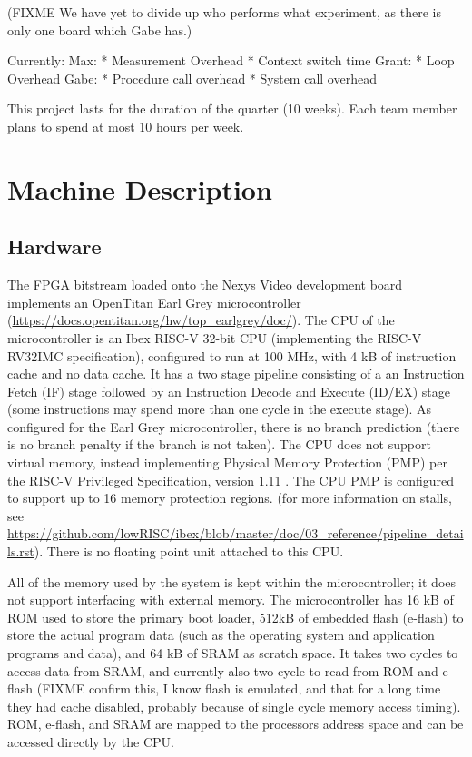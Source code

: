 \documentclass{article}
\begin{document}
(FIXME We have yet to divide up who performs what experiment, as there is only one board which Gabe has.)

Currently:
Max:
* Measurement Overhead
* Context switch time
Grant:
* Loop Overhead
Gabe:
* Procedure call overhead
* System call overhead

This project lasts for the duration of the quarter (10 weeks). Each team member plans to spend at most 10 hours per week.

\section{Machine Description}

\subsection{Hardware}
The FPGA bitstream loaded onto the Nexys Video development board implements an OpenTitan Earl Grey microcontroller (\url{https://docs.opentitan.org/hw/top_earlgrey/doc/}). The CPU of the microcontroller is an Ibex RISC-V 32-bit CPU (implementing the RISC-V RV32IMC specification), configured to run at 100 MHz, with 4 kB of instruction cache and no data cache. It has a two stage pipeline consisting of a an Instruction Fetch (IF) stage followed by an Instruction Decode and Execute (ID/EX) stage (some instructions may spend more than one cycle in the execute stage). As configured for the Earl Grey microcontroller, there is no branch prediction (there is no branch penalty if the branch is not taken). The CPU does not support virtual memory, instead implementing Physical Memory Protection (PMP) per the RISC-V Privileged Specification, version 1.11 \cite{riscv-priv}. The CPU PMP is configured to support up to 16 memory protection regions. (for more information on stalls, see \url{https://github.com/lowRISC/ibex/blob/master/doc/03\_reference/pipeline\_details.rst}). There is no floating point unit attached to this CPU.

All of the memory used by the system is kept within the microcontroller; it does not support interfacing with external memory. The microcontroller has 16 kB of ROM used to store the primary boot loader, 512kB of embedded flash (e-flash) to store the actual program data (such as the operating system and application programs and data), and 64 kB of SRAM as scratch space. It takes two cycles to access data from SRAM, and currently also two cycle to read from ROM and e-flash (FIXME confirm this, I know flash is emulated, and that for a long time they had cache disabled, probably because of single cycle memory access timing). ROM, e-flash, and SRAM are mapped to the processors address space and can be accessed directly by the CPU.
\end{document}
